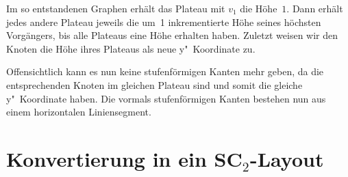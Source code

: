 \documentclass[a4paper]{scrreprt}
\theoremstyle{definition}
\begin{document}
Im so entstandenen Graphen erhält das Plateau mit $v_1$ die Höhe~$1$. Dann erhält jedes andere Plateau jeweils die um~1 inkrementierte Höhe seines höchsten Vorgängers, bis alle Plateaus eine Höhe erhalten haben. Zuletzt weisen wir den Knoten die Höhe ihres Plateaus als neue y"~Koordinate zu.

Offensichtlich kann es nun keine stufenförmigen Kanten mehr geben, da die entsprechenden Knoten im gleichen Plateau sind und somit die gleiche y"~Koordinate haben. Die vormals stufenförmigen Kanten bestehen nun aus einem horizontalen Liniensegment.

\section{Konvertierung in ein SC$_2$-Layout}
\label{sec:sc2conversion}
\end{document}
